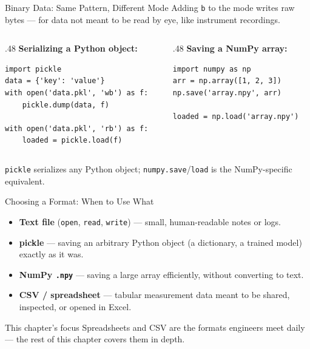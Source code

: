 \documentclass[9pt,aspectratio=169,xcolor=table]{beamer}
\begin{document}
\begin{frame}[fragile]{Binary Data: Same Pattern, Different Mode}
    \leavevmode
    Adding \texttt{b} to the mode writes raw bytes --- for data not
    meant to be read by eye, like instrument recordings.

    \begin{columns}[t]
        \begin{column}{.48\textwidth}
            \scriptsize \textbf{Serializing a Python object:}
\begin{lstlisting}
import pickle
data = {'key': 'value'}
with open('data.pkl', 'wb') as f:
    pickle.dump(data, f)

with open('data.pkl', 'rb') as f:
    loaded = pickle.load(f)
\end{lstlisting}
        \end{column}
        \begin{column}{.48\textwidth}
            \scriptsize \textbf{Saving a NumPy array:}
\begin{lstlisting}
import numpy as np
arr = np.array([1, 2, 3])
np.save('array.npy', arr)

loaded = np.load('array.npy')
\end{lstlisting}
        \end{column}
    \end{columns}

    \vspace{2mm}
    {\small \texttt{pickle} serializes any Python object;
    \texttt{numpy.save}/\texttt{load} is the NumPy-specific
    equivalent.}
\end{frame}

\begin{frame}{Choosing a Format: When to Use What}
    \leavevmode
    \small
    \begin{itemize}
        \item \textbf{Text file} (\texttt{open}, \texttt{read},
              \texttt{write}) --- small, human-readable notes or logs.
        \item \textbf{pickle} --- saving an arbitrary Python object
              (a dictionary, a trained model) exactly as it was.
        \item \textbf{NumPy \texttt{.npy}} --- saving a large array
              efficiently, without converting to text.
        \item \textbf{CSV / spreadsheet} --- tabular measurement data
              meant to be shared, inspected, or opened in Excel.
    \end{itemize}

    \vspace{3mm}
    \begin{block}{This chapter's focus}
        Spreadsheets and CSV are the formats engineers meet daily ---
        the rest of this chapter covers them in depth.
    \end{block}
\end{frame}
\end{document}
